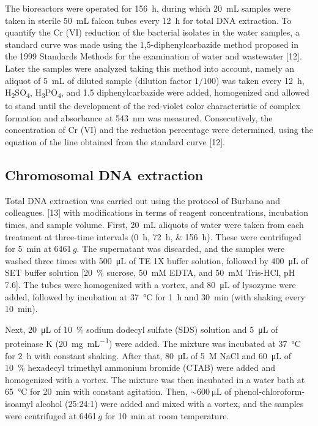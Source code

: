 \documentclass{univsciauth}
\begin{document}
The bioreactors were operated for \SI{156}{h}, during which \SI{20}{mL}
samples were taken in sterile \SI{50}{mL} falcon tubes every \SI{12}{h} for total
DNA extraction. To quantify the Cr (VI) reduction of the bacterial
isolates in the water samples, a standard curve was made using the
1,5-diphenylcarbazide method proposed in the 1999 Standards Methods for
the examination of water and wastewater {[}12{]}. Later the samples were
analyzed taking this method into account, namely an aliquot of \SI{5}{mL} of
diluted sample (dilution factor $1/100$) was taken every \SI{12}{h},
H\textsubscript{2}SO\textsubscript{4},
H\textsubscript{3}PO\textsubscript{4}, and 1.5 diphenylcarbazide were
added, homogenized and allowed to stand until the development of the
red-violet color characteristic of complex formation and absorbance at
\SI{543}{nm} was measured. Consecutively, the concentration of Cr (VI) and the
reduction percentage were determined, using the equation of the line
obtained from the standard curve {[}12{]}.

\subsection{Chromosomal DNA extraction}

Total DNA extraction was carried out using the protocol of Burbano and
colleagues. {[}13{]} with modifications in terms of reagent
concentrations, incubation times, and sample volume. First, \SI{20}{mL}
aliquots of water were taken from each treatment at three-time intervals
(\SIlist{0;72;156}{h}). These were centrifuged for \SI{5}{min} at 6461\,$g$.
The supernatant was discarded, and the samples were washed three times
with \SI{500}{\micro\liter} of TE 1X buffer solution, followed by \SI{400}{\micro\liter} of SET buffer
solution {[}\SI{20}{\%} sucrose, \SI{50}{mM} EDTA, and \SI{50}{mM} Tris-HCl, pH
7.6{]}. The tubes were homogenized with a vortex, and \SI{80}{\micro\liter} of lysozyme were
added, followed by incubation at \SI{37}{\celsius} for \SI{1}{h} and \SI{30}{min}
(with shaking every \SI{10}{min}).

Next, \SI{20}{\micro\liter} of \SI{10}{\%} sodium dodecyl sulfate (SDS) solution and
\SI{5}{\micro\liter} of
proteinase K (\SI{20}{mg.mL^{-1}}) were added. The mixture was incubated at
\SI{37}{\celsius}
for \SI{2}{h} with constant shaking. After that, \SI{80}{\micro\liter} of \SI{5}{M} NaCl
and \SI{60}{\micro\liter} of
\SI{10}{\%} hexadecyl trimethyl ammonium bromide (CTAB) were added and
homogenized with a vortex. The mixture was then incubated in a water
bath at \SI{65}{\celsius} for \SI{20}{min} with constant agitation. Then,
$\sim \SI{600}{\micro\liter}$ of phenol-chloroform-isoamyl alcohol (25:24:1)
were added and mixed with a vortex, and the samples were centrifuged at
6461\,$g$ for \SI{10}{min} at room temperature.
\end{document}
